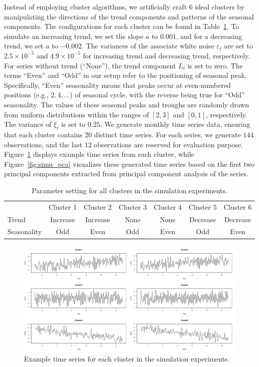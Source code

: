 \documentclass[a4paper,review,12pt,authoryear]{elsarticle}
\begin{document}
Instead of employing cluster algorithms, we artificially craft $6$ ideal clusters by manipulating the directions of the trend components and patterns of the seasonal components.
The configurations for each cluster can be found in Table~\ref{table:simu_params}. To simulate an increasing trend, we set the slope $a$ to $0.001$, and for a decreasing trend, we set $a$ to $-0.002$. The variances of the associate white noise $\varepsilon_t$ are set to $2.5\times 10^{-5}$ and $4.9\times 10^{-5}$ for increasing trend and decreasing trend, respectively. For series without trend (``None''), the trend component $L_t$ is set to zero. The terms ``Even'' and ``Odd'' in our setup refer to the positioning of seasonal peak. Specifically, ``Even'' seasonality means that peaks occur at even-numbered positions (e.g., $2, 4, \dots$) of seasonal cycle, with the reverse being true for ``Odd'' seasonality. The values of these seasonal peaks and troughs are randomly drawn from uniform distributions within the ranges of $[2, 3]$ and $[0,1]$, respectively. The variance of $\xi_t$ is set to $0.25$. We generate monthly time series data, ensuring that each cluster contains $20$ distinct time series. For each series, we generate $144$ observations, and the last $12$ observations are reserved for evaluation purpose. Figure~\ref{fig:simu_emps} displays example time series from each cluster, while Figure~\ref{fig:simu_pca} visualizes these generated time series based on the first two principal components extracted from principal component analysis of the series.

\begin{table}
\caption{\label{table:simu_params}Parameter setting for all clusters in the simulation experiments.}
\centering
\begin{tabular}{lcccccc}\toprule
& Cluster 1 & Cluster 2 & Cluster 3 & Cluster 4 & Cluster 5 & Cluster 6 \\
Trend & Increase & Increase & None & None & Decrease & Decrease \\
Seasonality & Odd & Even & Odd & Even & Odd & Even  \\
    \bottomrule
\end{tabular}
\end{table}

\begin{figure}
\centering
\includegraphics[width=\textwidth]{figures/simu_example.pdf}
\caption{\label{fig:simu_emps}Example time series for each cluster in the simulation experiments.}
\end{figure}
\end{document}
